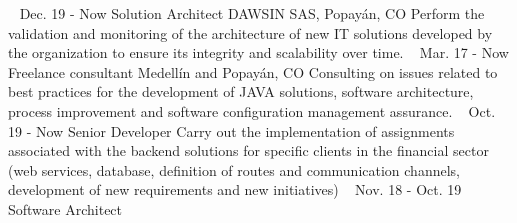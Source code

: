 \documentclass[american]{cv-class}
\begin{document}
\begin{entrylist}
	~ 
    \entry
	{Dec. 19 - Now}
	{Solution Architect}
	{DAWSIN SAS, Popayán, CO}
	{\justifying Perform the validation and monitoring of the architecture
	of new IT solutions developed by the organization to ensure its integrity and scalability over time.}
	~ 
    \entry
	{Mar. 17 - Now}
	{Freelance consultant}
	{Medellín and Popayán, CO}
	{\justifying Consulting on issues related to best practices for the development of JAVA solutions, software architecture, process improvement and software configuration management assurance.}
	~ 
    \entry
	{Oct. 19 - Now}
	{Senior Developer}
	{\href{https://tecso.coop/}{ }}
	{\justifying Carry out the implementation of assignments associated with the backend solutions for specific clients in the financial sector (web services, database, definition of routes and communication channels, development of new requirements and new initiatives)}
	~ 
    \entry
	{Nov. 18 - Oct. 19}
	{Software Architect}
	{\href{http://www.serviciosenweb.com/}{ }}

\end{entrylist}
\end{document}
